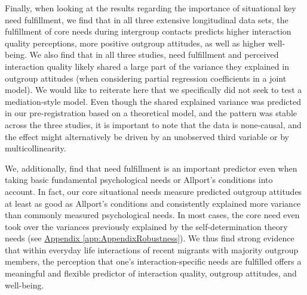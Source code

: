 \documentclass[man, 12pt, a4paper, mask]{apa7}
\theoremstyle{break}
\theoremstyle{plain}
\newcommand{\appref}[2][]{\hyperref[#2]{Appendix \ref*{#2}#1}}
\begin{document}
Finally, when looking at the results regarding the importance of situational key need fulfillment, we find that in all three extensive longitudinal data sets, the fulfillment of core needs during intergroup contacts predicts higher interaction quality perceptions, more positive outgroup attitudes, as well as higher well-being. We also find that in all three studies, need fulfillment and perceived interaction quality likely shared a large part of the variance they explained in outgroup attitudes (when considering partial regression coefficients in a joint model). We would like to reiterate here that we specifically did not seek to test a mediation-style model. Even though the shared explained variance was predicted in our pre-registration based on a theoretical model, and the pattern was stable across the three studies, it is important to note that the data is none-causal, and the effect might alternatively be driven by an unobserved third variable or by multicollinearity.

We, additionally, find that need fulfillment is an important predictor even when taking basic fundamental psychological needs or Allport's conditions into account. In fact, our core situational needs measure predicted outgroup attitudes at least as good as Allport's conditions and consistently explained more variance than commonly measured psychological needs. In most cases, the core need even took over the variances previously explained by the self-determination theory needs (see \appref{app:AppendixRobustness}). We thus find strong evidence that within everyday life interactions of recent migrants with majority outgroup members, the perception that one's interaction-specific needs are fulfilled offers a meaningful and flexible predictor of interaction quality, outgroup attitudes, and well-being.
\end{document}
